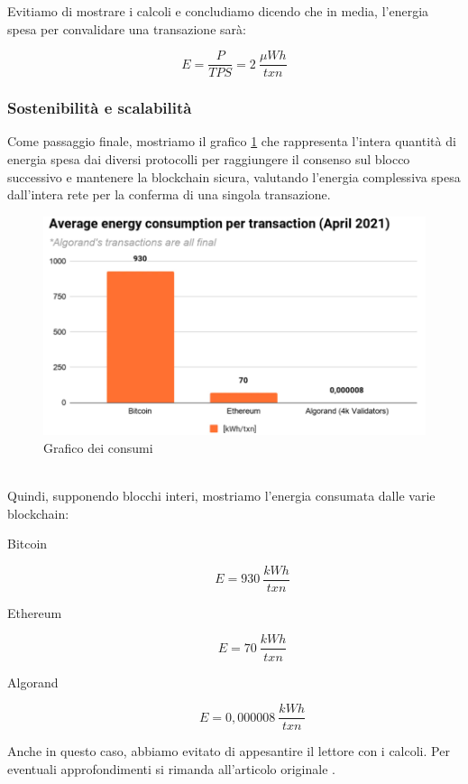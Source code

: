 Evitiamo di mostrare i calcoli e concludiamo dicendo che in media, l'energia spesa per convalidare una transazione sarà:

\begin{displaymath}
E = \frac{P}{TPS} = 2 \: \frac{\mu Wh}{txn}
\end{displaymath}

\subsubsection{Sostenibilità e scalabilità}
Come passaggio finale, mostriamo il grafico \ref{fig: graficoconsumi } che rappresenta l'intera quantità di energia spesa dai diversi protocolli per raggiungere il consenso sul blocco successivo e mantenere la blockchain sicura, valutando l'energia complessiva spesa dall'intera rete per la conferma di una singola transazione.
\begin{figure}[!h]
\centering
\includegraphics[scale=0.6]{images/schema_consumo.png}
\caption{Grafico dei consumi \cite{algorand_ambiente}}
\label{fig: graficoconsumi }
\end{figure}\\
Quindi, supponendo blocchi interi, mostriamo l'energia consumata dalle varie blockchain:
\begin{description}
    \item [Bitcoin] \begin{displaymath} E = 930 \: \frac{kWh}{txn} \end{displaymath}
    \item [Ethereum] \begin{displaymath} E = 70 \: \frac{kWh}{txn} \end{displaymath}
    \item [Algorand] \begin{displaymath} E = 0,000008 \: \frac{kWh}{txn} \end{displaymath}
\end{description}
Anche in questo caso, abbiamo evitato di appesantire il lettore con i calcoli. Per eventuali approfondimenti si rimanda all'articolo originale \cite{algorand_ambiente}.

